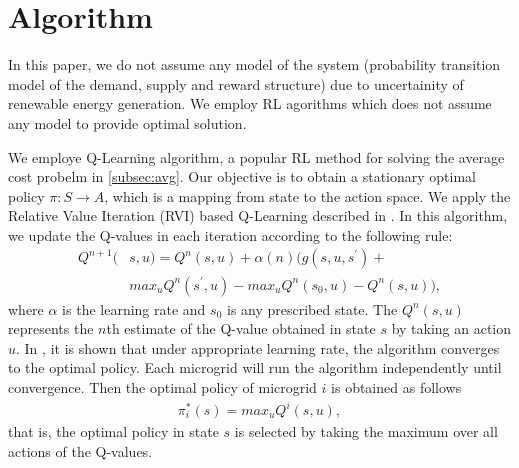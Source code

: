 \section{Algorithm}\label{sec:algo}


 In this paper, we do not assume any model of the system (probability transition model of the demand, supply and reward structure) due to uncertainity of renewable energy generation. We employ RL agorithms which does not assume any model to provide optimal solution.

We employe Q-Learning algorithm, a  popular RL method for solving the average cost probelm in \ref{subsec:avg}.
 Our objective is to obtain a stationary optimal policy $\pi : S \rightarrow A$, which is a mapping from state to the action space.  
We apply the Relative Value Iteration (RVI) based Q-Learning described in \cite{avgcost}. In this algorithm, we update the Q-values in each iteration according to the following rule:
\begin{align}
Q^{n+1}(&s,u) = Q^{n}(s,u) + \alpha(n)(g(s,u,s^{'}) + \nonumber\\ &  max_{u} Q^{n}(s^{'},u) - max_{u} Q^{n}(s_{0},u) - Q^{n}(s,u)),
\end{align}
where $\alpha$ is the learning rate and $s_{0}$ is any prescribed state.
The $Q^n(s,u)$ represents the $n$th estimate of the Q-value  obtained in state $s$ by taking an action $u$. In \cite{avgcost}, it is shown that under appropriate learning rate, the algorithm converges to the  optimal policy. 
Each microgrid will run the algorithm independently until convergence. Then the optimal policy of microgrid $i$ is obtained as follows
\begin{align}
\pi_{i}^{*}(s) = max_{u}Q^{i}(s,u),
\end{align}
that is, the optimal policy in state $s$ is selected by taking the maximum over all actions of the Q-values.  

